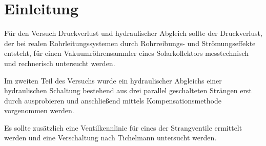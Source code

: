 \section{Einleitung}

Für den Versuch Druckverlust und hydraulischer Abgleich sollte der Druckverlust, der bei realen Rohrleitungssystemen durch Rohrreibungs- und Strömungseffekte entsteht, für einen Vakuumröhrensammler eines Solarkollektors messtechnisch und rechnerisch untersucht werden. 

Im zweiten Teil des Versuchs wurde ein hydraulischer Abgleichs einer hydraulischen Schaltung bestehend aus drei parallel geschalteten Strängen erst durch ausprobieren und anschließend mittels Kompensationsmethode vorgenommen werden. 

Es sollte zusätzlich eine Ventilkennlinie für eines der Strangventile ermittelt werden und eine Verschaltung nach Tichelmann untersucht werden. 